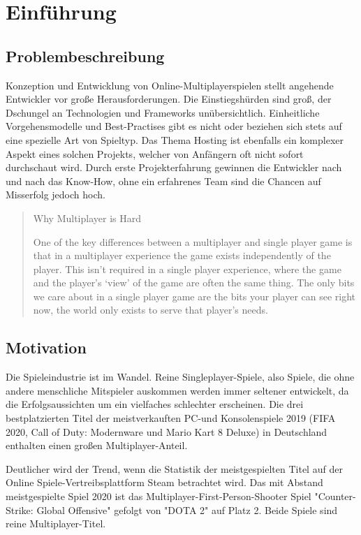 \chapter{Einführung}

\section{Problembeschreibung}

Konzeption und Entwicklung von Online-Multiplayerspielen stellt angehende Entwickler vor große Herausforderungen. Die Einstiegshürden sind groß, der Dschungel an Technologien und Frameworks unübersichtlich. Einheitliche Vorgehensmodelle und Best-Practises gibt es nicht oder beziehen sich stets auf eine spezielle Art von Spieltyp. Das Thema Hosting ist ebenfalls ein komplexer Aspekt eines solchen Projekts, welcher von Anfängern oft nicht sofort durchschaut wird. Durch erste Projekterfahrung gewinnen die Entwickler nach und nach das Know-How, ohne ein erfahrenes Team sind die Chancen auf Misserfolg jedoch hoch. 

\begin{quote}
	Why Multiplayer is Hard
	
	One of the key differences between a multiplayer and single player game is that in a multiplayer experience the game exists independently of the player. This isn’t required in a single player experience, where the game and the player’s ‘view’ of the game are often the same thing. The only bits we care about in a single player game are the bits your player can see right now, the world only exists to serve that player’s needs. \cite{Payne.18.09.2019}
\end{quote}


\section{Motivation}
Die Spieleindustrie ist im Wandel. Reine Singleplayer-Spiele, also Spiele, die ohne andere menschliche Mitspieler auskommen werden immer seltener entwickelt, da die Erfolgsaussichten um ein vielfaches schlechter erscheinen. Die drei bestplatzierten Titel der meistverkauften PC-und Konsolenspiele 2019 (FIFA 2020, Call of Duty: Modernware und Mario Kart 8 Deluxe) in Deutschland enthalten einen großen Multiplayer-Anteil.\cite{gameVerbandderdeutschenGamesBranchee.V..2020}

Deutlicher wird der Trend, wenn die Statistik der meistgespielten Titel auf der Online Spiele-Vertreibsplattform Steam betrachtet wird. Das mit Abstand meistgespielte Spiel 2020 ist das Multiplayer-First-Person-Shooter Spiel "Counter-Strike: Global Offensive" gefolgt von "DOTA 2" auf Platz 2. Beide Spiele sind reine Multiplayer-Titel.\cite{GitHyp.February2021}

